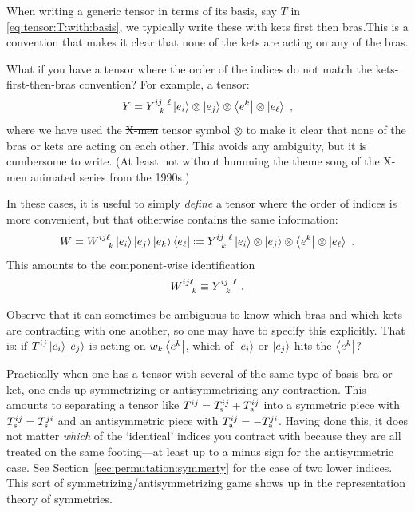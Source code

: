 \documentclass[12pt, oneside]{report}    %
\begin{document}
\begin{example}\label{eg:why:ketbra}
When writing a generic tensor in terms of its basis, say $T$ in \eqref{eq:tensor:T:with:basis}, we typically write these with kets first then bras.\sidenotemark This is a convention that makes it clear that none of the kets are acting on any of the bras.

What if you have a tensor where the order of the indices do not match the kets-first-then-bras convention? For example, a tensor:
\begin{align}
    Y = Y^{ij\phantom{k}\ell}_{\phantom{ij}k}
    \left|e_i\right\rangle\otimes\left|e_j\right\rangle\otimes\left\langle e^k\right|\otimes\left|e_\ell\right\rangle \ ,
\end{align}
where we have used the \sout{X-men} tensor symbol $\otimes$ to make it clear that none of the bras or kets are acting on each other. This avoids any ambiguity, but it is cumbersome to write. (At least not without humming the theme song of the X-men animated series from the 1990s.)

In these cases, it is useful to simply \emph{define} a tensor where the order of indices is more convenient, but that otherwise contains the same information:
\begin{align}
    W = W\aij{ij\ell}{k} 
    \ket{e_i}\ket{e_j} \ket{e_k} \bra{e_\ell}
    \defeq 
    Y^{ij\phantom{k}\ell}_{\phantom{ij}k}
    \ket{e_i} \otimes \ket{e_j} \otimes \bra{e^k} \otimes \ket{e_\ell}
    \ .
\end{align}
This amounts to the component-wise identification
\begin{align}
    W\aij{ij\ell}{k} \equiv Y^{ij\phantom{k}\ell}_{\phantom{ij}k} \ .
\end{align}

\end{example}

Observe that it can sometimes be ambiguous to know which bras and which kets are contracting with one another, so one may have to specify this explicitly. That is: if $T^{ij} \left|e_i\right\rangle\left|e_j\right\rangle$ is acting on $w_k\left\langle e^k\right|$, which of $\left|e_i\right\rangle$ or $\left|e_j\right\rangle$ hits the $\left\langle e^k\right|$? 

Practically when one has a tensor with several of the same type of basis bra or ket, one ends up symmetrizing or antisymmetrizing any contraction. This amounts to separating a tensor like $T^{ij} = T^{ij}_\textnormal{s} + T^{ij}_\textnormal{a}$ into a symmetric piece with $T_\textnormal{s}^{ij} = T_\textnormal{s}^{ji}$ and an antisymmetric piece with $T_\textnormal{a}^{ij}=-T_\textnormal{a}^{ji}$. Having done this, it does not matter \emph{which} of the `identical' indices you contract with because they are all treated on the same footing---at least up to a minus sign for the antisymmetric case. See Section~\ref{sec:permutation:symmerty} for the case of two lower indices. This sort of symmetrizing/antisymmetrizing game shows up in the representation theory of symmetries.
\end{document}
